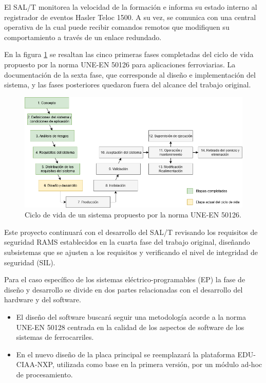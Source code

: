 \documentclass[11pt]{charter}
\begin{document}
El SAL/T monitorea la velocidad de la formación e informa su estado interno al registrador de eventos Hasler Teloc 1500.
A su vez, se comunica con una central operativa de la cual puede recibir comandos remotos que modifiquen su comportamiento
a través de un enlace redundado.

En la figura \ref{fig:ciclo_de_vida_50126} se resaltan las cinco primeras fases completadas del ciclo de vida propuesto 
por la norma UNE-EN 50126 para aplicaciones ferroviarias. La documentación de la sexta fase, que corresponde al diseño 
e implementación del sistema, y las fases posteriores quedaron fuera del alcance del trabajo original.

\vspace{10px}

\begin{figure}[htpb]
\centering 
\includegraphics[width=1\textwidth]{./Figuras/ciclo_de_vida_50126.png}
\caption{Ciclo de vida de un sistema propuesto por la norma UNE-EN 50126.}
\label{fig:ciclo_de_vida_50126}
\end{figure}

\vspace{10px}

Este proyecto continuará con el desarrollo del SAL/T revisando los requisitos de seguridad RAMS establecidos en la cuarta fase 
del trabajo original, diseñando subsistemas que se ajusten a los requisitos y verificando el nivel de integridad 
de seguridad (SIL).

Para el caso específico de los sistemas eléctrico-programables (EP) la fase de diseño y desarrollo se divide en dos 
partes relacionadas con el desarrollo del hardware y del software.

\begin{itemize}
\item El diseño del software buscará seguir una metodología acorde a la norma UNE-EN 50128 centrada en la calidad de los 
aspectos de software de los sistemas de ferrocarriles.
\item En el nuevo diseño de la placa principal se reemplazará la plataforma EDU-CIAA-NXP, utilizada como base en la primera 
versión, por un módulo ad-hoc de procesamiento.
\end{itemize}
\end{document}
